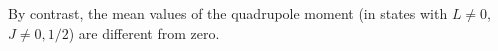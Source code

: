 By contrast, the mean values of the quadrupole moment (in states with $L\ne0$, $J\ne0,1/2$) are different
from zero.

